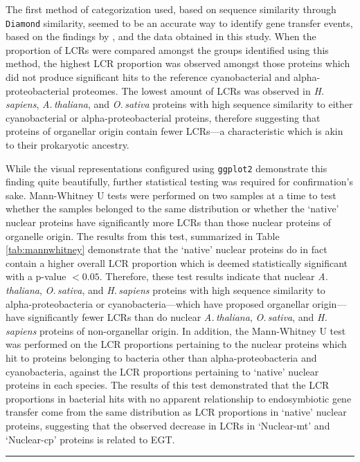 \documentclass[a4paper,12pt]{article}
\newcommand{\ath}{\mbox{\textit{A.\,thaliana}}\xspace}
\newcommand{\osa}{\mbox{\textit{O.\,sativa}}\xspace}
\newcommand{\hsa}{\mbox{\textit{H.\,sapiens}}\xspace}
\renewcommand{\diamond}{\mbox{\texttt{Diamond}}\xspace}
\begin{document}
\begin{multicols}{2}
The first method of categorization used, based on sequence similarity
through \diamond similarity, seemed to be an accurate way to identify
gene transfer events, based on the findings by \citet{MartinEtAl2002},
and the data obtained in this study. When the proportion of LCRs were
compared amongst the groups identified using this method, the highest
LCR proportion was observed amongst those proteins which did not produce
significant hits to the reference cyanobacterial and alpha-proteobacterial
proteomes. The lowest
amount of LCRs was observed in \hsa, \ath, and \osa proteins with
high sequence similarity to either cyanobacterial or
alpha-proteobacterial proteins, therefore suggesting
that proteins of organellar origin contain fewer
LCRs---a characteristic which is akin to their prokaryotic ancestry.

While the visual representations configured using \texttt{ggplot2} demonstrate this
finding quite beautifully, further statistical testing was required for
confirmation's sake. Mann-Whitney U tests were performed on two
samples at a time to test whether the samples belonged to the same
distribution or whether the `native' nuclear proteins have
significantly more LCRs than those nuclear proteins of organelle
origin. The results from this test, summarized in Table
\ref{tab:mannwhitney} demonstrate that the `native' nuclear proteins
do in fact contain a higher overall LCR proportion which is deemed
statistically significant with a p-value $<0.05$. Therefore, these test results
indicate that nuclear \ath, \osa, and \hsa proteins with high sequence
similarity to alpha-proteobacteria or cyanobacteria---which have proposed
organellar origin---have significantly fewer LCRs than do nuclear
\ath, \osa, and \hsa proteins of non-organellar origin. In addition, the
Mann-Whitney U test was performed on the LCR proportions pertaining
to the nuclear proteins which hit to proteins belonging to bacteria other than
alpha-proteobacteria and cyanobacteria, against the LCR proportions
pertaining to `native' nuclear proteins in each species. The results
of this test demonstrated that the LCR proportions in bacterial hits
with no apparent relationship to endosymbiotic gene transfer come
from the same distribution as LCR proportions in `native' nuclear
proteins, suggesting that the observed decrease in LCRs in `Nuclear-mt'
and `Nuclear-cp' proteins is related to EGT.


\rule{4cm}{1pt}


\end{multicols}
\end{document}
